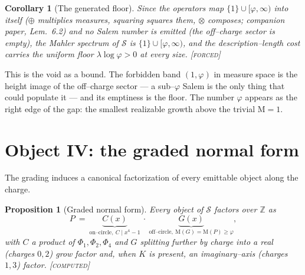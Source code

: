 \documentclass[11pt]{article}
\theoremstyle{plain}
\newtheorem{proposition}[theorem]{Proposition}
\newtheorem{corollary}[theorem]{Corollary}
\theoremstyle{definition}
\theoremstyle{remark}
\newcommand{\forced}{\textcolor{forcedc}{\textsc{[forced]}}}
\newcommand{\computed}{\textcolor{forcedc}{\textsc{[computed]}}}
\newcommand{\Z}{\mathbb{Z}}
\newcommand{\Mah}{\mathrm{M}}
\newcommand{\Scal}{\mathcal{S}}
\begin{document}
\begin{corollary}[The generated floor]\label{cor:floor}
Since the operators map $\{1\}\cup[\varphi,\infty)$ into itself ($\oplus$ multiplies measures, squaring squares them, $\otimes$ composes; companion paper, Lem.~6.2) and no Salem number is emitted (the off--charge sector is empty), the Mahler spectrum of $\Scal$ is $\{1\}\cup[\varphi,\infty)$, and the description--length cost carries the uniform floor $\lambda\log\varphi>0$ at every size. \forced
\end{corollary}

This is the void as a bound. The forbidden band $(1,\varphi)$ in measure space is the height image of the off--charge sector --- a sub--$\varphi$ Salem is the only thing that could populate it --- and its emptiness is the floor. The number $\varphi$ appears as the right edge of the gap: the smallest realizable growth above the trivial $\Mah=1$.

\section{Object IV: the graded normal form}\label{sec:normalIV}

The grading induces a canonical factorization of every emittable object along the charge.

\begin{proposition}[Graded normal form]\label{prop:normal}
Every object of $\Scal$ factors over $\Z$ as
\[
P\ =\ \underbrace{C(x)}_{\text{on--circle},\ C\mid x^4-1}\ \cdot\ \underbrace{G(x)}_{\text{off--circle},\ \Mah(G)=\Mah(P)\ge\varphi},
\]
with $C$ a product of $\Phi_1,\Phi_2,\Phi_4$ and $G$ splitting further by charge into a real (charges $0,2$) grow factor and, when $K$ is present, an imaginary--axis (charges $1,3$) factor. \computed
\end{proposition}
\end{document}
